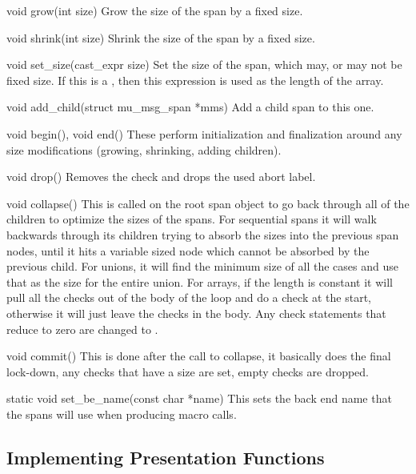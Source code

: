 \begin{cprototypelist}
  \item[void grow(int size)] Grow the size of the span by a fixed size.

  \item[void shrink(int size)] Shrink the size of the span by a fixed size.

  \item[void set_size(cast_expr size)] Set the size of the span,
  which may, or may not be fixed size.  If this is a ,
  then this expression is used as the length of the array.

  \item[void add_child(struct mu_msg_span *mms)] Add a child span
  to this one.

  \item[void begin(), void end()] These perform initialization and
  finalization around any size modifications (growing, shrinking, adding
  children).

  \item[void drop()] Removes the check and drops the used abort label.

  \item[void collapse()] This is called on the root span object to
  go back through all of the children to optimize the sizes of the spans.  For
  sequential spans it will walk backwards through its children trying to absorb
  the sizes into the previous span nodes, until it hits a variable sized node
  which cannot be absorbed by the previous child.  For unions, it will find the
  minimum size of all the cases and use that as the size for the entire union.
  For arrays, if the length is constant it will pull all the checks out of the
  body of the loop and do a check at the start, otherwise it will just leave
  the checks in the body.  Any check statements that reduce to zero are changed
  to .

  \item[void commit()] This is done after the call to collapse, it
  basically does the final lock-down, any checks that have a size are set,
  empty checks are dropped.

  \item[static void set_be_name(const char *name)] This sets the
  back end name that the spans will use when producing macro calls.
\end{cprototypelist}

\subsection{Implementing Presentation Functions}
\label{subsec:BE:Implementing Presentation Functions}

